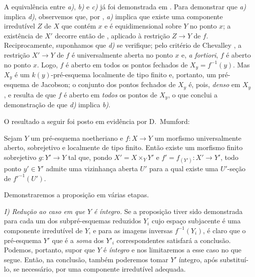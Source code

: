 A equivalência entre \emph{a)}, \emph{b)} e \emph{c)} já foi demonstrada em .
Para demonstrar que \emph{a)} implica \emph{d)}, observemos que, por , \emph{a)} implica que existe uma componente irredutível $Z$ de $X$ que contém $x$ e é equidimensional sobre $Y$ no ponto $x$; a existência de $X'$ decorre então de , aplicado à restrição $Z\to Y$ de $f$.
Reciprocamente, suponhamos que \emph{d)} se verifique; pelo critério de Chevalley , a restrição $X'\to Y$ de $f$ é universalmente aberta no ponto $x$ e, \emph{a fortiori}, $f$ é aberto no ponto $x$.
Logo, $f$ é aberto em todos os pontos fechados de $X_y=f^{-1}(y)$.
Mas $X_y$ é um $k(y)$-pré-esquema localmente de tipo finito e, portanto, um pré-esquema de Jacobson; o conjunto dos pontos fechados de $X_y$ é, pois, \emph{denso} em $X_y$ , e resulta de  que $f$ é aberto em \emph{todos} os pontos de $X_y$, o que conclui a demonstração de que \emph{d)} implica \emph{b)}.

O resultado a seguir foi posto em evidência por D.~Mumford:

\begin{proposition}[14.5.10]
\label{IV.14.5.10}
Sejam $Y$ um pré-esquema noetheriano e $f:X\to Y$ um morfismo universalmente aberto, sobrejetivo e localmente de tipo finito.
Então existe um morfismo finito sobrejetivo $g:Y'\to Y$ tal que, pondo $X'=X\times_Y Y'$ e $f'=f_{(Y')}:X'\to Y'$, todo ponto $y'\in Y'$ admite uma vizinhança aberta $U'$ para a qual existe uma $U'$-seção de $f'^{-1}(U')$.
\end{proposition}

Demonstraremos a proposição em várias etapas.


\emph{I) Redução ao caso em que $Y$ é íntegro.}
Se a proposição tiver sido demonstrada para cada um dos subpré-esquemas reduzidos $Y_i$ cujo espaço subjacente é uma componente irredutível de $Y$, e para as imagens inversas $f^{-1}(Y_i)$, é claro que o pré-esquema $Y'$ que é a \emph{soma} dos $Y'_i$ correspondentes satisfará a conclusão.
Podemos, portanto, supor que $Y$ é \emph{íntegro} e nos limitaremos a esse caso no que segue.
Então, na conclusão, também poderemos tomar $Y'$ íntegro, após substituí-lo, se necessário, por uma componente irredutível adequada.

